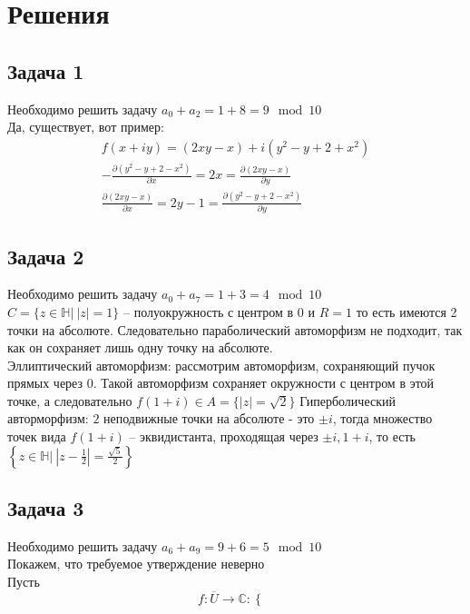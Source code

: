 
\newpage
\section*{Решения}
\subsection*{Задача 1}
	Необходимо решить задачу $a_0 + a_2 = 1 + 8 = 9 \mod 10$\\
	Да, существует, вот пример:
	\begin{gather*}
		f(x + iy) = (2xy-x) + i(y^2-y+2+x^2)\\
		-\frac{\partial (y^2-y+2-x^2)}{\partial x} = 2x = \frac{\partial (2xy-x)}{\partial y}\\
		\frac{\partial (2xy-x)}{\partial x} = 2y-1 = \frac{\partial (y^2-y+2-x^2)}{\partial y}
	\end{gather*}
\vskip 0.4in

\subsection*{Задача 2}
	Необходимо решить задачу $a_0 + a_7 = 1 + 3 = 4 \mod 10$\\
	$C = \{z \in \mathbb{H}|\ |z|=1\}$ -- полуокружность с центром в $0$ и $R = 1$ то есть имеются 2 точки на абсолюте. Следовательно параболический автоморфизм не подходит, так как он сохраняет лишь одну точку на абсолюте.\\
	Эллиптический автоморфизм: рассмотрим автоморфизм, сохраняющий пучок прямых через $0$. Такой автоморфизм сохраняет окружности с центром в этой точке, а следовательно $f(1+i) \in A = \{|z| = \sqrt{2}\}$
	Гиперболический авторморфизм: $2$ неподвижные точки на абсолюте - это $\pm i$, тогда множество точек вида $f(1+i)$ -- эквидистанта, проходящая через $\pm i, 1+i$, то есть $\left\{z \in \mathbb{H}|\ \left|z - \frac{1}{2}\right| = \frac{\sqrt{5}}{2}\right\}$
\vskip 0.4in

\subsection*{Задача 3}
	Необходимо решить задачу $a_6 + a_9 = 9 + 6 = 5 \mod 10$\\
	Покажем, что требуемое утверждение неверно\\
	Пусть
	\begin{equation*}
		f: \overline{U} \to \mathbb{C}:
		\begin{cases}

		\end{cases}
	\end{equation*}

